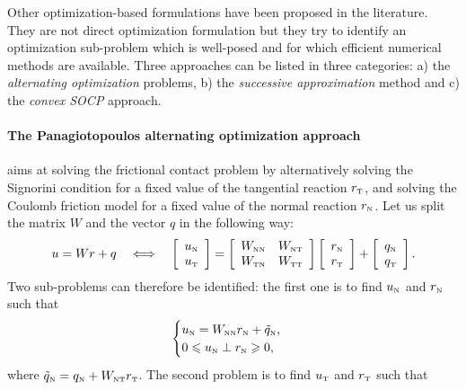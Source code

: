 {Other optimization-based formulations have been proposed in the literature. They are not direct optimization formulation but they try to identify an optimization sub-problem which is well-posed and for which efficient numerical methods are available. Three approaches can be listed in three categories: a)  the \emph{alternating optimization} problems, b) the \emph{successive approximation} method and c)  the \emph{convex SOCP} approach.


\paragraph{The Panagiotopoulos alternating optimization approach} aims at solving the frictional contact problem by alternatively solving the Signorini condition for a fixed value of the tangential reaction $r_{\hbox{\tiny{T}}}$, and solving the Coulomb friction model for a fixed value of the normal reaction $r_{\hbox{\tiny{N}}}$. 
Let us split the matrix $W$ and the vector $q$ in the following way:
\begin{equation}
  \label{eq:W-split}
  u = W r +q \quad \Longleftrightarrow \quad
  \left[\begin{array}{c}
    u_\n \\ u_\t
  \end{array}\right]
 =
  \left[\begin{array}{cc}
    W_{\n\n} &W_{\n\t} \\
    W_{\t\n} &W_{\t\t} \\    
  \end{array}\right]    \left[\begin{array}{c}
    r_\n\\ r_\t
  \end{array}\right]+
 \left[\begin{array}{c}
    q_\n \\q_\t
  \end{array}\right].
\end{equation}
Two sub-problems can therefore be identified: the first one is to find $u_{\hbox{\tiny{N}}}$ and $r_{\hbox{\tiny{N}}}$ such that
\begin{equation}
  \label{eq:AO-1}
  \begin{cases}
    u_\n = W_{\n\n} r_\n + \tilde q_\n, \\
    0\leq u_\n \perp r_\n \geq 0,
  \end{cases}
\end{equation}
where $\tilde q_{\hbox{\tiny{N}}} = q_{\hbox{\tiny{N}}} + W_{{\hbox{\tiny{N}}}{\hbox{\tiny{T}}}}r_{\hbox{\tiny{T}}}$. The second problem is to find $u_{\hbox{\tiny{T}}}$ and $r_{\hbox{\tiny{T}}}$ such that
\begin{equation}

\end{equation}}
